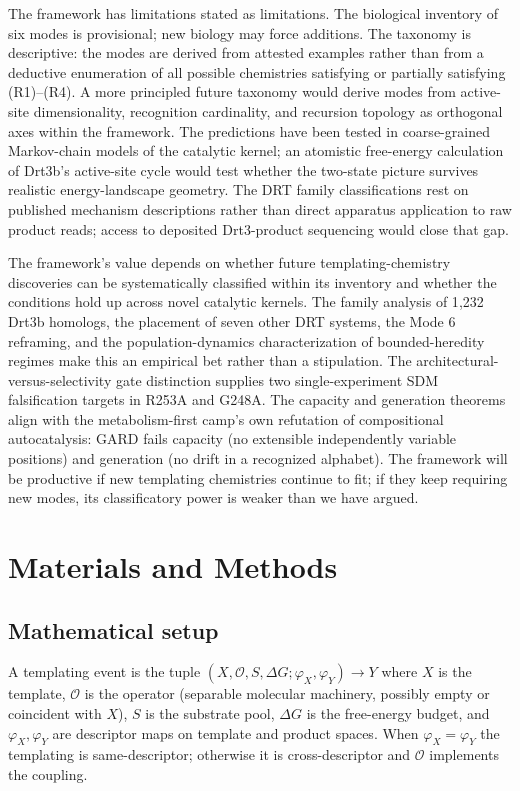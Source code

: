 \documentclass[aps,prx,reprint,amsmath,amssymb,floatfix,superscriptaddress,nofootinbib]{revtex4-2}
\theoremstyle{plain-thm}
\theoremstyle{definition-thm}
\newcommand{\descX}{\varphi_X}
\newcommand{\descY}{\varphi_Y}
\newcommand{\Op}{\mathcal{O}}
\begin{document}
The framework has limitations stated as limitations. The biological inventory of six modes is provisional; new biology may force additions. The taxonomy is descriptive: the modes are derived from attested examples rather than from a deductive enumeration of all possible chemistries satisfying or partially satisfying (R1)--(R4). A more principled future taxonomy would derive modes from active-site dimensionality, recognition cardinality, and recursion topology as orthogonal axes within the framework. The predictions have been tested in coarse-grained Markov-chain models of the catalytic kernel; an atomistic free-energy calculation of Drt3b's active-site cycle would test whether the two-state picture survives realistic energy-landscape geometry. The DRT family classifications rest on published mechanism descriptions rather than direct apparatus application to raw product reads; access to deposited Drt3-product sequencing would close that gap.

The framework's value depends on whether future templating-chemistry discoveries can be systematically classified within its inventory and whether the conditions hold up across novel catalytic kernels. The family analysis of 1{,}232 Drt3b homologs, the placement of seven other DRT systems, the Mode 6 reframing, and the population-dynamics characterization of bounded-heredity regimes make this an empirical bet rather than a stipulation. The architectural-versus-selectivity gate distinction supplies two single-experiment SDM falsification targets in R253A and G248A. The capacity and generation theorems align with the metabolism-first camp's own refutation of compositional autocatalysis: GARD fails capacity (no extensible independently variable positions) and generation (no drift in a recognized alphabet). The framework will be productive if new templating chemistries continue to fit; if they keep requiring new modes, its classificatory power is weaker than we have argued.


\section{Materials and Methods}

\subsection{Mathematical setup}

A templating event is the tuple $(X, \Op, S, \Delta G; \descX, \descY) \to Y$ where $X$ is the template, $\Op$ is the operator (separable molecular machinery, possibly empty or coincident with $X$), $S$ is the substrate pool, $\Delta G$ is the free-energy budget, and $\descX, \descY$ are descriptor maps on template and product spaces. When $\descX = \descY$ the templating is same-descriptor; otherwise it is cross-descriptor and $\Op$ implements the coupling.
\end{document}
